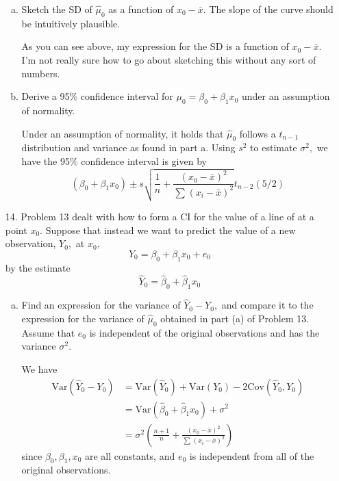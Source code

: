 \documentclass{article}
\newcommand{\var}{\mathrm{Var}}
\newcommand{\cov}{\mathrm{Cov}}
\begin{document}
\begin{itemize}
\begin{enumerate}[a.]
			\item Sketch the SD of $\hat\mu_0$ as a function of $x_0-\bar x.$ The slope of the curve should be intuitively plausible.
				\begin{answer*}
					As you can see above, my expression for the SD is a function of $x_0-\bar x.$ I'm not really sure how to go about sketching this without any sort of numbers.
				\end{answer*}

			\item Derive a 95\% confidence interval for $\mu_0=\beta_0+\beta_1x_0$ under an assumption of normality.
				\begin{soln}
					Under an assumption of normality, it holds that $\hat\mu_0$ follows a $t_{n-1}$ distribution and variance as found in part a. Using $s^2$ to estimate $\sigma^2,$ we have the 95\% confidence interval is given by
					\[(\beta_0+\beta_1x_0) \pm s\sqrt{\frac{1}{n} + \frac{(x_0-\bar x)^2}{\sum_{}^{}(x_i-\bar x)^2}} t_{n-2}(5/2)\]
				\end{soln}
				
		\end{enumerate}
			
	\item[14.] Problem 13 dealt with how to form a CI for the value of a line of at a point $x_0.$ Suppose that instead we want to predict the value of a new observation, $Y_0,$ at $x_0,$ \[Y_0=\beta_0+\beta_1x_0+e_0\] by the estimate \[\hat Y_0=\hat\beta_0+\hat\beta_1x_0\]
		\begin{enumerate}[a.]
			\item Find an expression for the variance of $\hat Y_0-Y_0,$ and compare it to the expression for the variance of $\hat\mu_0$ obtained in part (a) of Problem 13. Assume that $e_0$ is independent of the original observations and has the variance $\sigma^2.$
				\begin{soln}
					We have
					\begin{align*}
						\var(\hat Y_0-Y_0) &= \var(\hat Y_0) +\var(Y_0) - 2\cov(\hat Y_0, Y_0) \\
						&=\var(\hat\beta_0+\hat\beta_1 x_0) + \sigma^2 \\
						&= \sigma^2 \left( \frac{n+1}{n} + \frac{(x_0-\bar x)^2}{\sum_{}^{}(x_i-\bar x)^2}\right)
					\end{align*}
					since $\beta_0, \beta_1, x_0$ are all constants, and $e_0$ is independent from all of the original observations.
				\end{soln}


\end{enumerate}
\end{itemize}
\end{document}
